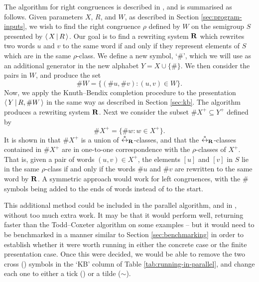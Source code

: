 The algorithm for right congruences is described in \cite[\S2.8]{sims}, and is
summarised as follows.  Given parameters $X$, $R$, and $W$, as described in
Section \ref{sec:program-inputs}, we wish to find the right congruence $\rho$
defined by $W$ on the semigroup $S$ presented by $\left\langle \, X \, \middle| \, R \, \right\rangle$.
Our goal is to find a rewriting system $\mathbf{R}$ which rewrites two words $u$ and
$v$ to the same word if and only if they represent elements of $S$ which are in
the same $\rho$-class.  We define a new symbol, `$\#$', which we will use as an
additional generator in the new alphabet $Y = X \cup \{\#\}$.  We then consider the
pairs in $W$, and produce the set
$$\#W = \{(\#u, \#v) : (u, v) \in W\}.$$
Now, we apply the Knuth--Bendix completion procedure to the presentation
$\left\langle \, Y \, \middle| \, R, \#W \, \right\rangle$ in the same way as described in Section \ref{sec:kb}.  The
algorithm produces a rewriting system $\mathbf{R}$.  Next we consider the subset
$\#X^+ \subseteq Y^+$ defined by
$$\#X^+ = \{\#w : w \in X^+\}.$$
It is shown in \cite[\S2.8]{sims} that $\#X^+$ is a union of
$\stackrel{*}{\leftrightarrow}_{\mathbf{R}}$-classes, and that the $\stackrel{*}{\leftrightarrow}_{\mathbf{R}}$-classes contained in $\#X^+$
are in one-to-one correspondence with the $\rho$-classes of $X^+$.  That is,
given a pair of words $(u,v) \in X^+$, the elements $[u]$ and $[v]$ in $S$ lie
in the same $\rho$-class if and only if the words $\#u$ and $\#v$ are rewritten to
the same word by $\mathbf{R}$.  A symmetric approach would work for left congruences,
with the $\#$ symbols being added to the ends of words instead of to the start.

This additional method could be included in the parallel algorithm, and in
\libsemigroups{}, without too much extra work.  It may be that it would perform
well, returning faster than the Todd--Coxeter algorithm on some examples -- but it would need
to be benchmarked in a manner similar to Section \ref{sec:benchmarking} in order
to establish whether it were worth running in either the concrete case or the
finite presentation case.  Once this were decided, we would be able to remove the
two cross (\xmark) symbols in the `KB' column of Table
\ref{tab:running-in-parallel}, and change each one to either a tick (\cmark) or
a tilde ($\sim$).
